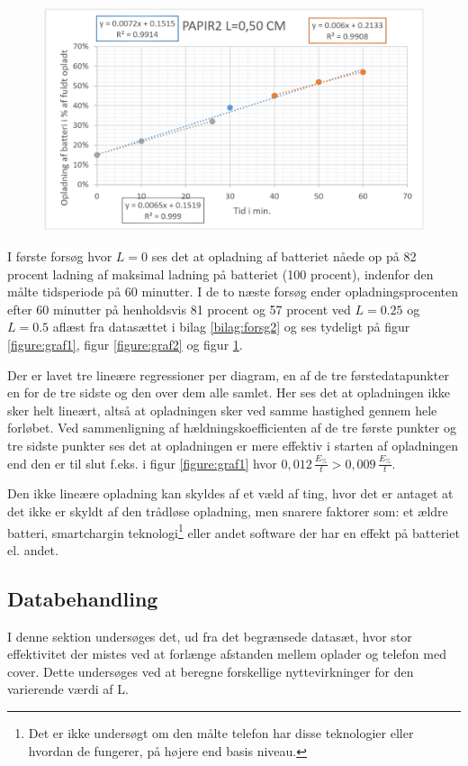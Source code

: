 \begin{figure}[H]
\centering
\includegraphics[width=1\textwidth]{Setup/forsg2_graf3}
\caption{}
\label{figure:graf3}
\end{figure}

\newpage

I første forsøg hvor $L = 0$ ses det at opladning af batteriet nåede op på 82 procent ladning af maksimal ladning på batteriet (100 procent), indenfor den målte tidsperiode på 60 minutter. I de to næste forsøg ender opladningsprocenten efter 60 minutter på henholdsvis 81 procent og 57 procent ved $L = 0.25$ og $L = 0.5$ aflæst fra datasættet i bilag \ref{bilag:forsg2} og ses tydeligt på figur \ref{figure:graf1}, figur \ref{figure:graf2} og figur \ref{figure:graf3}.

Der er lavet tre lineære regressioner per diagram, en af de tre førstedatapunkter en for de tre sidste og den over dem alle samlet. Her ses det at opladningen ikke sker helt lineært, altså at opladningen sker ved samme hastighed gennem hele forløbet. Ved sammenligning af hældningskoefficienten af de tre første punkter og tre sidste punkter ses det at opladningen er mere effektiv i starten af opladningen end den er til slut f.eks. i figur \ref{figure:graf1} hvor $0,012\, \frac{E_\%}{t} > 0,009\, \frac{E_\%}{t}$.

Den ikke lineære opladning kan skyldes af et væld af ting, hvor det er antaget at det ikke er skyldt af den trådløse opladning, men snarere faktorer som: et ældre batteri, smartchargin teknologi\footnote{Det er ikke undersøgt om den målte telefon har disse teknologier eller hvordan de fungerer, på højere end basis niveau.} eller andet software der har en effekt på batteriet el. andet. 

\subsection{Databehandling}
I denne sektion undersøges det, ud fra det begrænsede datasæt, hvor stor effektivitet der mistes ved at forlænge afstanden mellem oplader og telefon med cover. Dette undersøges ved at beregne forskellige nyttevirkninger for den varierende værdi af L. 

